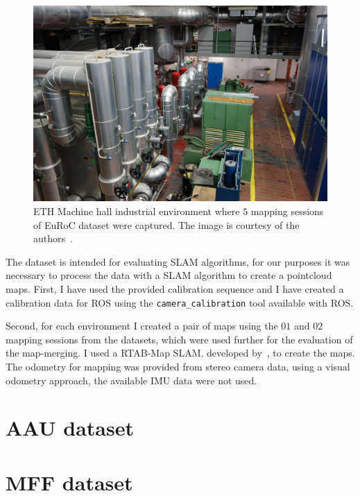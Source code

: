 \begin{figure}
    \centering
    \includegraphics[width=\textwidth]{../img/eth_machine_room.jpg}
    \caption[ETH Machine hall]{ETH Machine hall industrial environment where $5$ mapping sessions of EuRoC dataset were captured. The image is courtesy of the authors~\citep{Burri2016}.}
    \label{fig:eth-machine-hall}
\end{figure}

The dataset is intended for evaluating \gls{SLAM} algorithms, for our purposes it was necessary to process the data with a \gls{SLAM} algorithm to create a pointcloud maps. First, I have used the provided calibration sequence and I have created a calibration data for \gls{ROS} using the \texttt{camera\_calibration} tool available with \gls{ROS}.

Second, for each environment I created a pair of maps using the $01$ and $02$ mapping sessions from the datasets, which were used further for the evaluation of the map-merging. I used a RTAB-Map \gls{SLAM}, developed by~\citet{labbe2014online}, to create the maps. The odometry for mapping was provided from stereo camera data, using a visual odometry approach, the available \gls{IMU} data were not used.



\section{AAU dataset}
\label{sec:aau-dataset}

\section{MFF dataset}
\label{sec:mff-dataset}